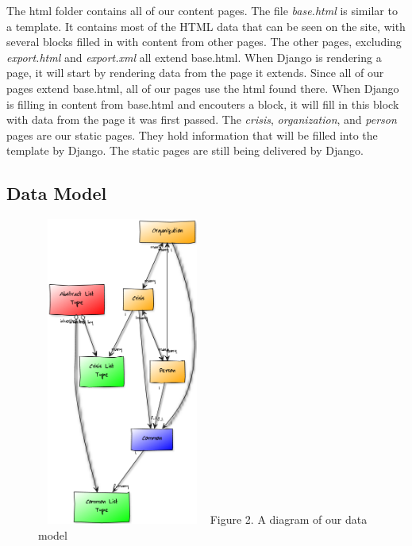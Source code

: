 \documentclass[12pt]{report}
\begin{document}
The html folder contains all of our content pages.
The file \emph{base.html} is similar to a template.
It contains most of the HTML data that can be seen on the site, with several blocks filled in with content from other pages.
The other pages, excluding \emph{export.html} and \emph{export.xml} all extend base.html.
When Django is rendering a page, it will start by rendering data from the page it extends.
Since all of our pages extend base.html, all of our pages use the html found there.
When Django is filling in content from base.html and encouters a block,
it will fill in this block with data from the page it was first passed.
The \emph{crisis}, \emph{organization}, and \emph{person} pages are our static pages.
They hold information that will be filled into the template by Django.
The static pages are still being delivered by Django.\\

\newpage
\subsection*{Data Model}
\hfill


\begin{figure}
\vspace{-20pt}
\begin{flushright}
\includegraphics*[width=0.5\textwidth,height=4in]{dataModelDiagram.png}
\newline
\footnotesize
Figure 2. A diagram of our data model %
\end{flushright}
\end{figure}
\normalsize
\end{document}

